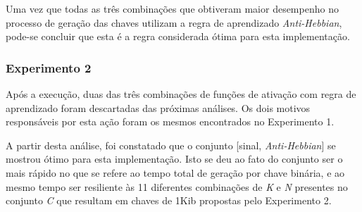 \documentclass[12pt]{article}
\newcommand{\bits}{\textit{bits}\xspace}
\begin{document}
                Uma vez que todas as três combinações que obtiveram maior desempenho no processo de geração das chaves utilizam a regra de aprendizado \textit{Anti-Hebbian}, pode-se concluir que esta é a regra considerada ótima para esta implementação.
            
            \subsubsection{Experimento 2}
            \label{subsubsec:experimentoGamma}
            
                Após a execução, duas das três combinações de funções de ativação com regra de aprendizado foram descartadas das próximas análises. Os dois motivos responsáveis por esta ação foram os mesmos encontrados no Experimento 1.
                
                
                
                A partir desta análise, foi constatado que o conjunto [sinal, \textit{Anti-Hebbian}] se mostrou ótimo para esta implementação. Isto se deu ao fato do conjunto ser o mais rápido no que se refere ao tempo total de geração por chave binária, e ao mesmo tempo ser resiliente às 11 diferentes combinações de \textit{K} e \textit{N} presentes no conjunto \textit{C} que resultam em chaves de 1Kib propostas pelo Experimento 2.
                
                
\end{document}
